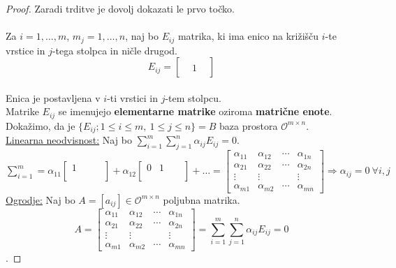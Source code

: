 \documentclass[a4paper,12pt]{article}
\begin{document}
\begin{proof}
	Zaradi trditve je dovolj dokazati le prvo točko. \\

	 \\

	Za $i=1,\ldots,m$, $m_j=1,\ldots,n$, naj bo $E_{ij}$ matrika, ki ima enico na križišču $i$-te vrstice in $j$-tega stolpca in ničle drugod. \\

	$$ E_{ij} = \begin{bmatrix}
		& &  \\
		& 1  \\
		& & 
	\end{bmatrix} $$ \\

	Enica je postavljena v $i$-ti vrstici in $j$-tem stolpcu.\\

	Matrike $E_{ij}$ se imenujejo \textbf{elementarne matrike} oziroma \textbf{matrične enote}. \\

	Dokažimo, da je $\{E_{ij}; 1 \leq i \leq m,~1\leq j \leq n\}= B$ baza prostora $\mathcal{O}^{m\times n}$. \\
	
	\underline{Linearna neodvisnost:} Naj bo $\sum_{i=1}^m \sum_{j=1}^n \alpha_{ij}E_{ij}=0$. \\

	$\sum_{i=1}^m = \alpha_{11} 
	\begin{bmatrix}
		1 & & & \\
		  & & & \\
		  & & &
	\end{bmatrix}
	+ \alpha_{12} 
	\begin{bmatrix}
		0 & 1 & & \\
		  &   & & \\
		  &   & &
	\end{bmatrix}
	+\ldots =
	\begin{bmatrix}
		\alpha_{11} & \alpha_{12} & \cdots & \alpha_{1n} \\
		\alpha_{21} & \alpha_{22} & \cdots & \alpha_{2n} \\
		\vdots & \vdots & & \vdots \\
		\alpha_{m1} & \alpha_{m2} & \cdots & \alpha_{mn}
	 \end{bmatrix}
	 \Rightarrow \alpha_{ij}=0~\forall i,j$ \\

	 \underline{Ogrodje:} Naj bo $A=[a_{ij}]\in \mathcal{O}^{m\times n}$ poljubna matrika. \\

	 $$A = \begin{bmatrix}
		\alpha_{11} & \alpha_{12} & \cdots & \alpha_{1n} \\
		\alpha_{21} & \alpha_{22} & \cdots & \alpha_{2n} \\
		\vdots & \vdots & & \vdots \\
		\alpha_{m1} & \alpha_{m2} & \cdots & \alpha_{mn}
	 \end{bmatrix} = \sum_{i=1}^m \sum_{j=1}^n \alpha_{ij}E_{ij}=0$$. 
\end{proof}
\end{document}
